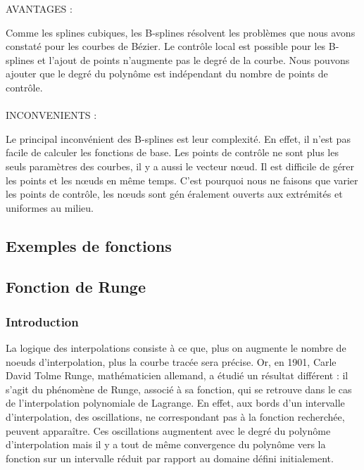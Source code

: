 \documentclass{article}
\begin{document}
\begin{flushleft}
AVANTAGES :
\end{flushleft}
\par
Comme les splines cubiques, les B-splines r\'{e}solvent les probl\`{e}mes que nous avons constat\'{e} pour les courbes de B\'{e}zier. Le contr\^{o}le local est possible pour les B-splines et l'ajout de points n'augmente pas le degr\'{e} de la courbe. Nous pouvons ajouter que le degr\'{e} du polyn\^{o}me est ind\'{e}pendant du nombre de points de contr\^{o}le.
\\\\
INCONVENIENTS :
\\
\par
Le principal inconv\'{e}nient des B-splines est leur complexit\'{e}. En effet, il n'est pas facile de calculer les fonctions de base. Les points de contr\^{o}le ne sont plus les seuls param\`{e}tres des courbes, il y a aussi le vecteur n\oe{}ud. Il est difficile de g\'{e}rer les points et les n\oe{}uds en m\^{e}me temps. C'est pourquoi nous ne faisons que varier les points de contr\^{o}le, les n\oe{}uds sont g\'{e}n \'{e}ralement ouverts aux extr\'{e}mit\'{e}s et uniformes au milieu.

\newpage
\begin{huge}
\section{Exemples de fonctions}
\end{huge}

\begin{huge}
\subsection{Fonction de Runge}
\end{huge}
\begin{huge}
\subsubsection{Introduction} 
\end{huge}

La logique des interpolations consiste \`{a} ce que, plus on augmente le nombre de noeuds d'interpolation, plus la courbe trac\'{e}e sera pr\'{e}cise. Or, en 1901, Carle David Tolme Runge, math\'{e}maticien allemand, a \'etudi\'e un r\'{e}sultat diff\'{e}rent : il s'agit du ph\'{e}nom\`{e}ne de Runge, associ\'{e} \`a sa fonction, qui se retrouve dans le cas de l'interpolation polynomiale de Lagrange. En effet, aux bords d'un intervalle d'interpolation, des oscillations, ne correspondant pas \`a la fonction recherch\'{e}e, peuvent appara\^itre. Ces oscillations augmentent avec le degr\'{e} du polyn\^ome d'interpolation mais il y a tout de m\^eme convergence du polyn\^ome vers la fonction sur un intervalle r\'{e}duit par rapport au domaine d\'{e}fini initialement.
\end{document}
